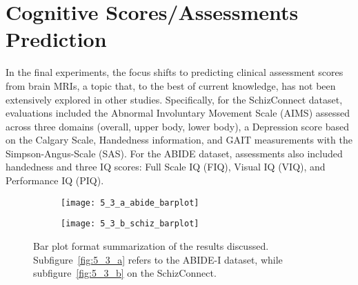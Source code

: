 \section{Cognitive Scores/Assessments Prediction}
In the final experiments, the focus shifts to predicting clinical assessment
scores from brain MRIs, a topic that, to the best of current knowledge, has not
been extensively explored in other studies. Specifically, for the SchizConnect
dataset, evaluations included the Abnormal Involuntary Movement Scale (AIMS)
assessed across three domains (overall, upper body, lower body), a Depression
score based on the Calgary Scale, Handedness information, and GAIT measurements
with the Simpson-Angus-Scale (SAS). For the ABIDE dataset, assessments also
included handedness and three IQ scores: Full Scale IQ (FIQ), Visual IQ (VIQ),
and Performance IQ (PIQ). 
\begin{figure*}[t]
    \begin{subfigure}[t]{.45\linewidth}
        \texttt{[image: 5\_3\_a\_abide\_barplot]}
        \caption{}
    \end{subfigure}
    \hfill
    \begin{subfigure}[t]{.45\linewidth}
        \texttt{[image: 5\_3\_b\_schiz\_barplot]}
        \caption{}
    \end{subfigure}
    \caption[Results Summary (Bar Plots)]{Bar plot format summarization of the
    results discussed. Subfigure~\ref{fig:5_3_a} refers to the ABIDE-I dataset,
    while subfigure~\ref{fig:5_3_b} on the SchizConnect.}
\end{figure*}

